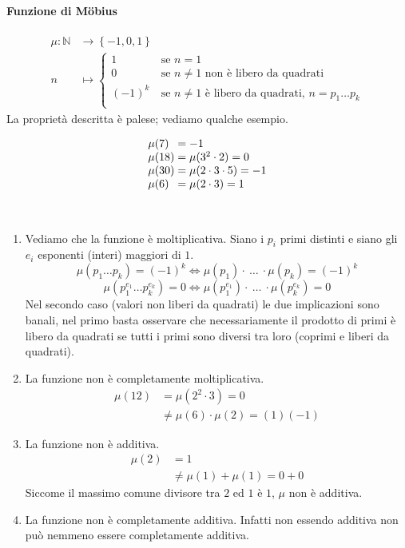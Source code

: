 \paragraph{Funzione di M\"obius}
\begin{align*}
\mu: \mathbb{N}&\longrightarrow \left\{-1,0,1\right\}\\
n &\longmapsto 
\begin{cases}
1 \  & \text{se $n=1$}\\
0 \  & \text{se $n\neq1$ non è libero da quadrati}\\
(-1)^k \  & \text{se $n\neq1$ è libero da quadrati, $n=p_1\dots p_k$}\\
\end{cases}
\end{align*}
La proprietà descritta è palese; vediamo qualche esempio.
\begin{esempio}
	\begin{equation*}
	\arraycolsep=1.4pt
	\begin{array}{ll}
		\mu(7)&=-1	\\ 
		\mu(18)&=\mu(3^2\cdot2)=0\\
		\mu(30)& =\mu(2\cdot3\cdot5)=-1\\
		\mu(6) &=\mu(2\cdot3)=1
	\end{array}
	\end{equation*}
\end{esempio}
\begin{osservazione}[Proprietà] \
	\begin{enumerate}
		\item Vediamo che la funzione è moltiplicativa. Siano i $p_i$ primi distinti e siano gli $e_i$ esponenti (interi) maggiori di $1$.
		\begin{equation*}
		\mu(p_1\dots p_k)=(-1)^k \iff \mu(p_1)\cdot \ \dots \ \cdot \mu(p_k)=(-1)^k
		\end{equation*}
		\begin{equation*}
		\mu(p_1^{e_1}\dots p_k^{e_k})=0 \iff \mu(p_1^{e_1})\cdot \ \dots \ \cdot \mu(p_k^{e_k})=0
		\end{equation*}
		Nel secondo caso (valori non liberi da quadrati) le due implicazioni sono banali, nel primo basta osservare che necessariamente il prodotto di primi è libero da quadrati se tutti i primi sono diversi tra loro (coprimi e liberi da quadrati).
		\item La funzione non è completamente moltiplicativa.
		\begin{align*}
		\mu(12)&=\mu(2^2\cdot3)=0\\ &\neq \mu(6)\cdot \mu(2)=(1)(-1)
		\end{align*}
		\item La funzione non è additiva.
		\begin{align*}
		\mu(2)&=1\\
		&\neq \mu(1)+\mu(1)=0+0
		\end{align*}
		Siccome il massimo comune divisore tra $2$ ed $1$ è $1$, $\mu$ non è additiva.
		\item La funzione non è completamente additiva. Infatti non essendo additiva non può nemmeno essere completamente additiva.
		
	\end{enumerate}
\end{osservazione}
